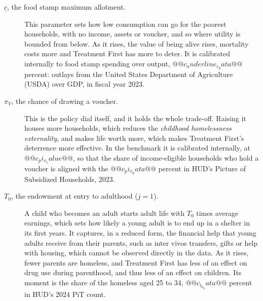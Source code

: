 \documentclass[10pt]{article}
\begin{document}
\begin{description}
\item[$\underline c$, the food stamp maximum allotment.] This parameter sets how low consumption can go for the poorest households, with no income, assets or voucher, and so where utility is bounded from below. As it rises, the value of being alive rises, mortality costs more and Treatment First has more to deter. It is calibrated internally to food stamp spending over output, $@@c_underline_c_data@@$ percent: outlays from the United States Department of Agriculture (USDA) over GDP, in fiscal year 2023.
\item[$\pi_V$, the chance of drawing a voucher.] This is the policy dial itself, and it holds the whole trade-off. Raising it houses more households, which reduces the \emph{childhood homelessness externality}, and makes life worth more, which makes Treatment First's deterrence more effective. In the benchmark it is calibrated internally, at $@@c_pi_v_value@@$, so that the share of income-eligible households who hold a voucher is aligned with the $@@c_pi_v_data@@$ percent in HUD's Picture of Subsidized Households, 2023.
\item[$T_0$, the endowment at entry to adulthood ($j=1$).] A child who becomes an adult starts adult life with $T_0$ times average earnings, which sets how likely a young adult is to end up in a shelter in its first years. It captures, in a reduced form,
the financial help that young adults receive from their parents, such as inter vivos transfers, gifts or help with
housing, which cannot be observed directly in the data.   As it rises, fewer parents are homeless, and Treatment First has less of an effect on drug use during parenthood, and thus less of an effect on children. Its moment is the share of the homeless aged 25 to 34, $@@c_t_0_data@@$ percent in HUD's 2024 PiT count.
\end{description}
\end{document}
